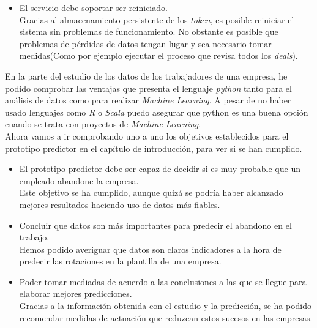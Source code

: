 \begin{itemize}
	\item El servicio debe soportar ser reiniciado.\\
	
	Gracias al almacenamiento persistente de los \textit{token}, es posible reiniciar el sistema sin problemas de funcionamiento. No obstante es posible que problemas de pérdidas de datos tengan lugar y sea necesario tomar medidas(Como por ejemplo ejecutar el proceso que revisa todos los \textit{deals}).

\end{itemize}	

En la parte del estudio de los datos de los trabajadores de una empresa, he podido comprobar las ventajas que presenta el lenguaje \textit{python} tanto para el análisis de datos como para realizar \textit{Machine Learning}.
A pesar de no haber usado lenguajes como \textit{R} o \textit{Scala} puedo asegurar que python es una buena opción cuando se trata con proyectos de \textit{Machine Learning}.\\

Ahora vamos a ir comprobando uno a uno los objetivos establecidos para el prototipo predictor en el capítulo de introducción, para ver si se han cumplido.

\begin{itemize}
	
	\item El prototipo predictor debe ser capaz de decidir si es muy probable que un empleado abandone la empresa.\\
	
	Este objetivo se ha cumplido, aunque quizá se podría haber alcanzado mejores resultados haciendo uso de datos más fiables.
	\item Concluir que datos son más importantes para predecir el abandono en el trabajo.\\
	
	Hemos podido averiguar que datos son claros indicadores a la hora de predecir las rotaciones en la plantilla de una empresa.
	\item Poder tomar mediadas de acuerdo a las conclusiones a las que se llegue para elaborar mejores predicciones.\\
	
	Gracias a la información obtenida con el estudio y la predicción, se ha podido recomendar medidas de actuación que reduzcan estos sucesos en las empresas.
\end{itemize}





